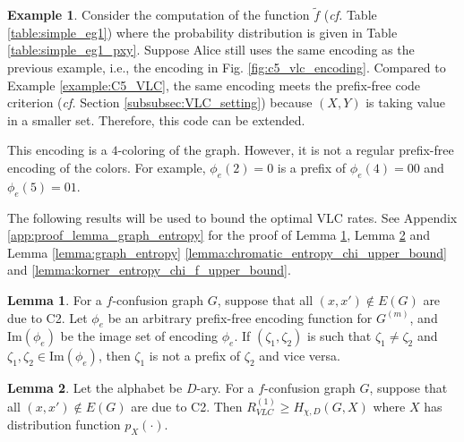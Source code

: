 \documentclass[journal, onecolumn, draftcls]{IEEEtran}
\theoremstyle{definition}
\newtheorem{lemma}{Lemma}
\newtheorem{example}{Example}
\newcommand{\meng}[1]{\marginpar{+}{\bf Ruoyu's remark}: {\em #1}}
\newcommand{\aditya}[1]{\marginpar{+}{\bf Aditya's remark}: {\em #1}}
\begin{document}
\begin{example}  \label{example:C5_VLC_f} Consider the computation of the function $\tilde f$ ({\it cf.} Table \ref{table:simple_eg1}) where the probability distribution is given in Table \ref{table:simple_eg1_pxy}. Suppose  Alice still uses the same encoding as the previous example, i.e., the encoding in Fig. \ref{fig:c5_vlc_encoding}. Compared to Example \ref{example:C5_VLC}, the same encoding meets the prefix-free code criterion ({\it cf.} Section \ref{subsubsec:VLC_setting}) because  $(X,Y)$ is taking value in a smaller set. Therefore, this code can be extended. 

This encoding is a $4$-coloring of the graph. However, it is not a regular prefix-free encoding of the colors. For example, $\phi_e(2)=0$ is a prefix of $\phi_e(4)=00$ and $\phi_e(5)=01$.  
\end{example}

The following results will be used to bound the optimal VLC rates. See  Appendix \ref{app:proof_lemma_graph_entropy} for the proof of Lemma \ref{lemma:prefix_free_OR_prod}, Lemma \ref{lemma:ont_shot_entropy_OR_prod} and Lemma \ref{lemma:graph_entropy} \ref{lemma:chromatic_entropy_chi_upper_bound} and \ref{lemma:korner_entropy_chi_f_upper_bound}.%
\begin{lemma}\label{lemma:prefix_free_OR_prod}
For a $f$-confusion graph $G$, suppose that all $(x,x')\notin E(G)$ are due to C2.  Let $\phi_e$ be an arbitrary prefix-free encoding function for $G^{(m)}$, and  $\text{Im}(\phi_e)$ be the image set of encoding $\phi_e$. If $(\zeta_1,\zeta_2)$ is such that  $\zeta_1\ne \zeta_2$ and $\zeta_1,\zeta_2\in \text{Im}(\phi_e)$,  then $\zeta_1$ is not a prefix of $\zeta_2$ and vice versa. %
\end{lemma} 
\begin{lemma}\label{lemma:ont_shot_entropy_OR_prod}
Let the alphabet be $D$-ary. For a $f$-confusion graph $G$, suppose that all $(x,x')\notin E(G)$ are due to C2. Then $R_{VLC}^{(1)} \ge H_{\chi,D}(G,X)$ where $X$ has distribution function $p_X(\cdot)$.%
\end{lemma}%
\end{document}

